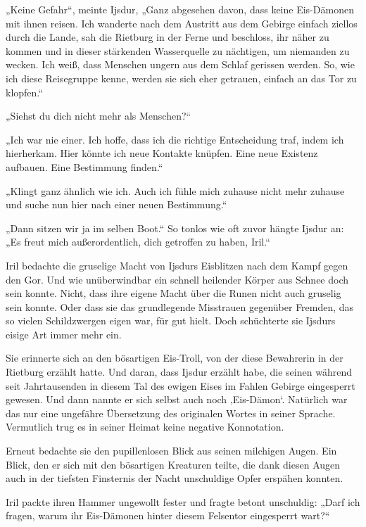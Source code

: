 „Keine Gefahr“, meinte Ijsdur, „Ganz abgesehen davon, dass keine Eis-Dämonen mit ihnen reisen. Ich wanderte nach dem Austritt aus dem Gebirge einfach ziellos durch die Lande, sah die Rietburg in der Ferne und beschloss, ihr näher zu kommen und in dieser stärkenden Wasserquelle zu nächtigen, um niemanden zu wecken. Ich weiß, dass Menschen ungern aus dem Schlaf gerissen werden. So, wie ich diese Reisegruppe kenne, werden sie sich eher getrauen, einfach an das Tor zu klopfen.“

„Siehst du dich nicht mehr als Menschen?“

„Ich war nie einer. Ich hoffe, dass ich die richtige Entscheidung traf, indem ich hierherkam. Hier könnte ich neue Kontakte knüpfen. Eine neue Existenz aufbauen. Eine Bestimmung finden.“

„Klingt ganz ähnlich wie ich. Auch ich fühle mich zuhause nicht mehr zuhause und suche nun hier nach einer neuen Bestimmung.“

„Dann sitzen wir ja im selben Boot.“ So tonlos wie oft zuvor hängte Ijsdur an: „Es freut mich außerordentlich, dich getroffen zu haben, Iril.“

Iril bedachte die gruselige Macht von Ijsdurs Eisblitzen nach dem Kampf gegen den Gor. Und wie unüberwindbar ein schnell heilender Körper aus Schnee doch sein konnte. Nicht, dass ihre eigene Macht über die Runen nicht auch gruselig sein konnte. Oder dass sie das grundlegende Misstrauen gegenüber Fremden, das so vielen Schildzwergen eigen war, für gut hielt. Doch schüchterte sie Ijsdurs eisige Art immer mehr ein.

Sie erinnerte sich an den bösartigen Eis-Troll, von der diese Bewahrerin in der Rietburg erzählt hatte. Und daran, dass Ijsdur erzählt habe, die seinen während seit Jahrtausenden in diesem Tal des ewigen Eises im Fahlen Gebirge eingesperrt gewesen. Und dann nannte er sich selbst auch noch ‚Eis-Dämon‘. Natürlich war das nur eine ungefähre Übersetzung des originalen Wortes in seiner Sprache. Vermutlich trug es in seiner Heimat keine negative Konnotation.

Erneut bedachte sie den pupillenlosen Blick aus seinen milchigen Augen. Ein Blick, den er sich mit den bösartigen Kreaturen teilte, die dank diesen Augen auch in der tiefsten Finsternis der Nacht unschuldige Opfer erspähen konnten.

Iril packte ihren Hammer ungewollt fester und fragte betont unschuldig: „Darf ich fragen, warum ihr Eis-Dämonen hinter diesem Felsentor eingesperrt wart?“

